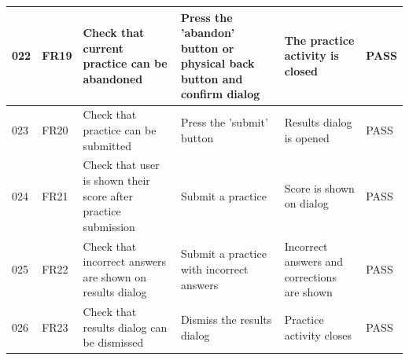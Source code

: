 \documentclass[runningheads]{llncs}
\begin{document}
\begin{subappendices}
		\newpage
		
		\begin{table}
			\begin{tabularx}{\textwidth}{|l|X|X|X|X|l|}
				\hline
				022 & FR19 & Check that current practice can be abandoned & Press the 'abandon' button or physical back button and confirm dialog & The practice activity is closed & PASS \\
				\hline
				023 & FR20 & Check that practice can be submitted & Press the 'submit' button & Results dialog is opened & PASS \\
				\hline
				024 & FR21 & Check that user is shown their score after practice submission & Submit a practice & Score is shown on dialog & PASS \\
				\hline
				025 & FR22 & Check that incorrect answers are shown on results dialog & Submit a practice with incorrect answers & Incorrect answers and corrections are shown & PASS \\
				\hline
				026 & FR23 & Check that results dialog can be dismissed & Dismiss the results dialog & Practice activity closes & PASS \\
				\hline 
			\end{tabularx}
		\end{table}
	\end{subappendices}
\end{document}
